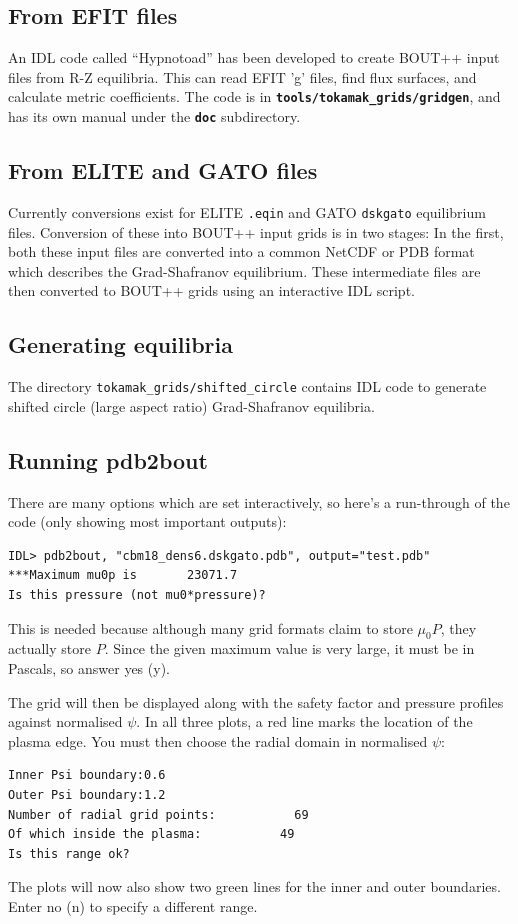 \documentclass[12pt]{article}
\newcommand{\code}[1]{\texttt{#1}}
\newcommand{\file}[1]{\texttt{\bf #1}}
\begin{document}
\subsection{From EFIT files}
An IDL code called ``Hypnotoad'' has been developed to create BOUT++ input files from
R-Z equilibria. This can read EFIT 'g' files, find flux surfaces, and calculate metric coefficients.
The code is in \file{tools/tokamak\_grids/gridgen}, and has its own manual under the \file{doc} subdirectory.

\subsection{From ELITE and GATO files}
Currently conversions exist for ELITE \code{.eqin} and GATO \code{dskgato} equilibrium files.
Conversion of these into BOUT++ input grids is in two stages: In the first, both these
input files are converted into a common NetCDF or PDB format which describes the Grad-Shafranov equilibrium.
These intermediate files are then converted to BOUT++ grids using an interactive IDL script.


\subsection{Generating equilibria}

The directory \texttt{tokamak\_grids/shifted\_circle} contains IDL code to generate shifted circle
(large aspect ratio) Grad-Shafranov equilibria.

\subsection{Running pdb2bout}

There are many options which are set interactively, so here's a run-through of the code (only showing most important outputs):

\begin{verbatim}
IDL> pdb2bout, "cbm18_dens6.dskgato.pdb", output="test.pdb"
***Maximum mu0p is       23071.7
Is this pressure (not mu0*pressure)?
\end{verbatim}
This is needed because although many grid formats claim to store $\mu_0 P$, they actually store $P$. Since the given maximum value is very large, it must be in Pascals, so answer yes (y).

The grid will then be displayed along with the safety factor and pressure
profiles against normalised $\psi$. In all three plots, a red line marks the
location of the plasma edge. You must then choose the radial domain in normalised $\psi$:
\begin{verbatim}
Inner Psi boundary:0.6
Outer Psi boundary:1.2
Number of radial grid points:           69
Of which inside the plasma:           49
Is this range ok?
\end{verbatim}
The plots will now also show two green lines for the inner and outer boundaries. Enter no (n) to specify a different range.
\end{document}

